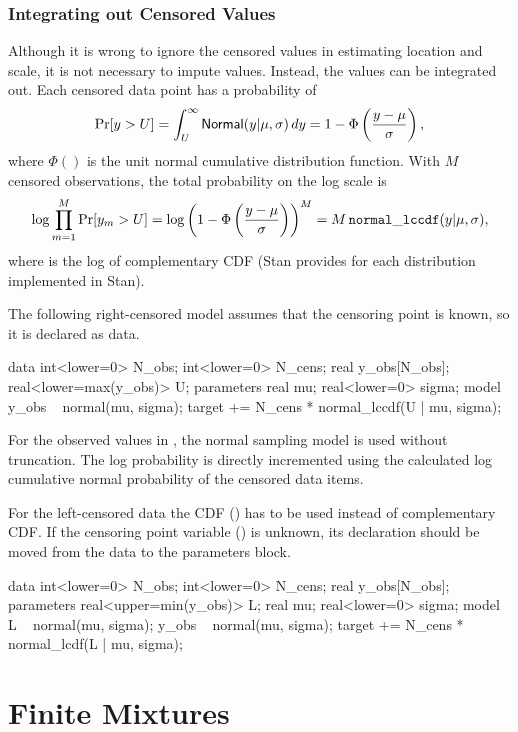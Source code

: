 \subsection{Integrating out Censored Values}

Although it is wrong to ignore the censored values in estimating
location and scale, it is not necessary to impute values.  Instead,
the values can be integrated out.  Each censored data point has a
probability of
%
\[
\mbox{Pr}[y > U]
= \int_U^{\infty} \mbox{\sf Normal}(y|\mu,\sigma) \, dy
= 1 - \Phi\left(\frac{y - \mu}{\sigma}\right),
\]
%
where $\Phi()$ is the unit normal cumulative distribution function.
With $M$ censored observations, the total probability on the log scale
is
\[
\log \prod_{m=1}^M \mbox{Pr}[y_m > U]
= \log \left( 1 - \Phi\left(\frac{y - \mu}{\sigma}\right)\right)^{M}
= M \, {\tt normal\_lccdf}(y | \mu, \sigma),
\]
%
where  is the log of complementary CDF
(Stan provides  for each distribution
implemented in Stan).

The following right-censored model assumes
that the censoring point is known, so it is declared as data.
%
\begin{stancode}
data {
  int<lower=0> N_obs;
  int<lower=0> N_cens;
  real y_obs[N_obs];
  real<lower=max(y_obs)> U;
}
parameters {
  real mu;
  real<lower=0> sigma;
}
model {
  y_obs ~ normal(mu, sigma);
  target += N_cens * normal_lccdf(U | mu, sigma);
}
\end{stancode}
%
For the observed values in , the normal sampling model is
used without truncation.  The log probability is directly incremented
using the calculated log cumulative normal probability of the censored
data items.

For the left-censored data the CDF () has to be
used instead of complementary CDF.  If the censoring point variable
() is unknown, its declaration should be moved from the data
to the parameters block.
%
\begin{stancode}
data {
  int<lower=0> N_obs;
  int<lower=0> N_cens;
  real y_obs[N_obs];
}
parameters {
  real<upper=min(y_obs)> L;
  real mu;
  real<lower=0> sigma;
}
model {
  L ~ normal(mu, sigma);
  y_obs ~ normal(mu, sigma);
  target += N_cens * normal_lcdf(L | mu, sigma);
}
\end{stancode}
%


\chapter{Finite Mixtures}\label{mixture-modeling.chapter}

